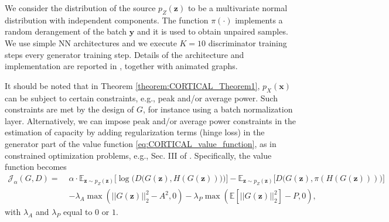 We consider the distribution of the source $p_Z(\mathbf{z})$ to be a multivariate normal distribution with independent components. The function $\pi (\cdot)$ implements a random derangement of the batch $\mathbf{y}$ and it is used to obtain unpaired samples. We use simple NN architectures and we execute $K=10$ discriminator training steps every generator training step. Details of the architecture and implementation are reported in \cite{CORTICAL_github}, together with animated graphs.

It should be noted that in Theorem \ref{theorem:CORTICAL_Theorem1}, $p_X(\mathbf{x})$ can be subject to certain constraints, e.g., peak and/or average power. Such constraints are met by the design of $G$, for instance using a batch normalization layer. 
Alternatively, we can impose peak and/or average power constraints in the estimation of capacity by adding regularization terms (hinge loss) in the generator part of the value function \eqref{eq:CORTICAL_value_function}, as in constrained optimization problems, e.g., Sec. III of \cite{Faycal2001}. Specifically, the value function becomes
\begin{align}
\mathcal{J}_{\alpha}(G,D) = \; & \alpha \cdot \mathbb{E}_{\mathbf{z} \sim p_{Z}(\mathbf{z})}\biggl[\log \biggl(D\biggl(G(\mathbf{z}),H(G(\mathbf{z}))\biggr)\biggr)\biggr] -\mathbb{E}_{\mathbf{z} \sim p_{Z}(\mathbf{z})}\biggl[D\biggl(G(\mathbf{z}),\pi(H(G(\mathbf{z})))\biggr)\biggr] \nonumber \\ 
& - \lambda_A \max(||G(\mathbf{z})||^2_2-A^2,0) - \lambda_P \max(\mathbb{E}[||G(\mathbf{z})||^2_2]-P,0),
\label{eq:CORTICAL_value_function_lambda}
\end{align}
with $\lambda_A$ and $\lambda_P$ equal to $0$ or $1$.

